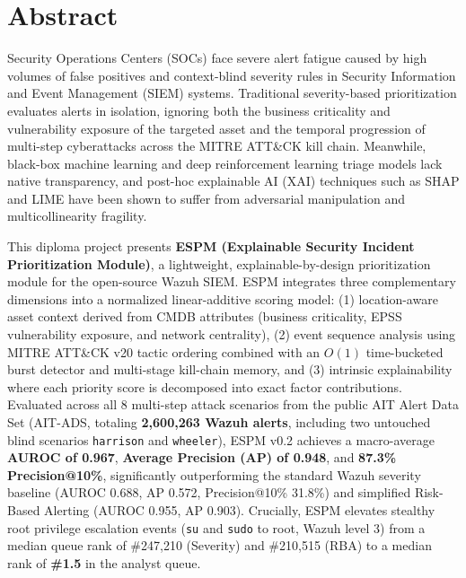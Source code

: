 %
%
\chapter*{Abstract}

Security Operations Centers (SOCs) face severe alert fatigue caused by high volumes of false positives and context-blind severity rules in Security Information and Event Management (SIEM) systems. Traditional severity-based prioritization evaluates alerts in isolation, ignoring both the business criticality and vulnerability exposure of the targeted asset and the temporal progression of multi-step cyberattacks across the MITRE ATT\&CK kill chain. Meanwhile, black-box machine learning and deep reinforcement learning triage models lack native transparency, and post-hoc explainable AI (XAI) techniques such as SHAP and LIME have been shown to suffer from adversarial manipulation and multicollinearity fragility.

This diploma project presents \textbf{ESPM (Explainable Security Incident Prioritization Module)}, a lightweight, explainable-by-design prioritization module for the open-source Wazuh SIEM. ESPM integrates three complementary dimensions into a normalized linear-additive scoring model: (1) location-aware asset context derived from CMDB attributes (business criticality, EPSS vulnerability exposure, and network centrality), (2) event sequence analysis using MITRE ATT\&CK v20 tactic ordering combined with an $O(1)$ time-bucketed burst detector and multi-stage kill-chain memory, and (3) intrinsic explainability where each priority score is decomposed into exact factor contributions. Evaluated across all 8 multi-step attack scenarios from the public AIT Alert Data Set (AIT-ADS, totaling \textbf{2,600,263 Wazuh alerts}, including two untouched blind scenarios \texttt{harrison} and \texttt{wheeler}), ESPM v0.2 achieves a macro-average \textbf{AUROC of 0.967}, \textbf{Average Precision (AP) of 0.948}, and \textbf{87.3\% Precision@10\%}, significantly outperforming the standard Wazuh severity baseline (AUROC 0.688, AP 0.572, Precision@10\% 31.8\%) and simplified Risk-Based Alerting (AUROC 0.955, AP 0.903). Crucially, ESPM elevates stealthy root privilege escalation events (\texttt{su} and \texttt{sudo} to root, Wazuh level 3) from a median queue rank of \#247,210 (Severity) and \#210,515 (RBA) to a median rank of \textbf{\#1.5} in the analyst queue.

\vspace{4mm}
